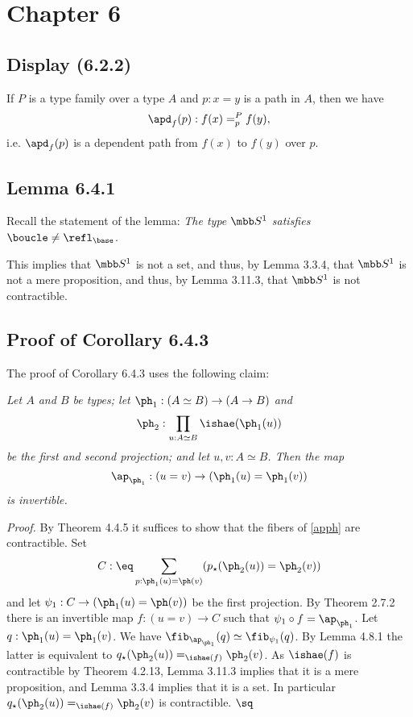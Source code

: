 \documentclass[12pt]{article}
\begin{document}


\section{Chapter 6}

\subsection{Display (6.2.2)}

If $P$ is a type family over a type $A$ and $p:x=y$ is a path in $A$, then we have 
$$
\apd_f(p):f(x)=^P_pf(y),
$$ 
i.e. $\apd_f(p)$ is a dependent path from $f(x)$ to $f(y)$ over $p$.


\subsection{Lemma 6.4.1}

Recall the statement of the lemma: \emph{The type $\mbb S^1$ satisfies} $\boucle\neq\refl_{\base}$. 

This implies that $\mbb S^1$ is not a set, and thus, by Lemma 3.3.4, that $\mbb S^1$ is not a mere proposition, and thus, by Lemma 3.11.3, that $\mbb S^1$ is not contractible.


\subsection{Proof of Corollary 6.4.3} %


The proof of Corollary 6.4.3 uses the following claim:

\nn{} \emph{Let $A$ and $B$ be types; let $\ph_1:(A\simeq B)\to(A\to B)$ and 
$$
\ph_2:\prod_{u:A\simeq B}\ishae(\ph_1(u))
$$ 
be the first and second projection; and let $u,v:A\simeq B$. Then the map 
\begin{equation}\label{apph}
\ap_{\ph_1}:(u=v)\to(\ph_1(u)=\ph_1(v))
\end{equation}
is invertible.}

\nn\emph{Proof.} By Theorem 4.4.5 it suffices to show that the fibers of \eqref{apph} are contractible. Set 
$$
C:\eq\sum_{p:\ph_1(u)=\ph(v)}(p_\star(\ph_2(u))=\ph_2(v))
$$ 
and let $\psi_1:C\to(\ph_1(u)=\ph(v))$ be the first projection. By Theorem 2.7.2 there is an invertible map $f:(u=v)\to C$ such that $\psi_1\circ f=\ap_{\ph_1}$. Let $q:\ph_1(u)=\ph_1(v)$. We have $\fib_{\ap_{\ph_1}}(q)\simeq\fib_{\psi_1}(q)$. By Lemma 4.8.1 the latter is equivalent to $q_\star(\ph_2(u))=_{\ishae(f)}\ph_2(v)$. As $\ishae(f)$ is contractible by Theorem 4.2.13, Lemma 3.11.3 implies that it is a mere proposition, and Lemma 3.3.4 implies that it is a set. In particular $q_\star(\ph_2(u))=_{\ishae(f)}\ph_2(v)$ is contractible. $\sq$
\end{document}
